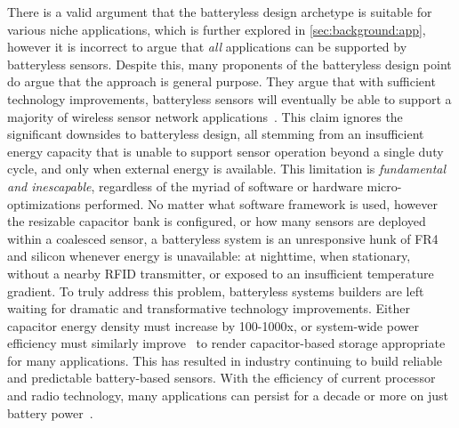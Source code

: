 There is a valid argument that the batteryless design archetype is suitable for various niche applications, which is further explored in \cref{sec:background:app}, however it is incorrect to argue that \textit{all} applications can be supported by batteryless sensors. 
Despite this, many proponents of the batteryless design point do argue that the approach is general purpose. They argue that with sufficient technology improvements, batteryless sensors will eventually be able to support a majority of wireless sensor network applications~\cite{hester2017future}. 
This claim ignores the significant downsides to batteryless design, all stemming from an insufficient energy capacity that is unable to support sensor operation beyond a single duty cycle, and only when external energy is available. 
This limitation is \textit{fundamental and inescapable}, regardless of the myriad of software or hardware micro-optimizations performed.
No matter what software framework is used, however the resizable capacitor bank is configured, or how many sensors are deployed within a coalesced sensor, a batteryless system is an unresponsive hunk of FR4 and silicon whenever energy is unavailable: at nighttime, when stationary, without a nearby RFID transmitter, or exposed to an insufficient temperature gradient.
To truly address this problem, batteryless systems builders are left waiting for dramatic and transformative technology improvements. Either capacitor energy density must increase by 100-1000x, or system-wide power efficiency must similarly improve~\cite{curtiss2021facebit} to render capacitor-based storage appropriate for many applications.
This has resulted in industry continuing to build reliable and predictable battery-based sensors. 
With the efficiency of current processor and radio technology, many applications can persist for a decade or more on just battery power~\cite{emersonRosemount,GEInsightMesh,honeywellOneWireless}.




